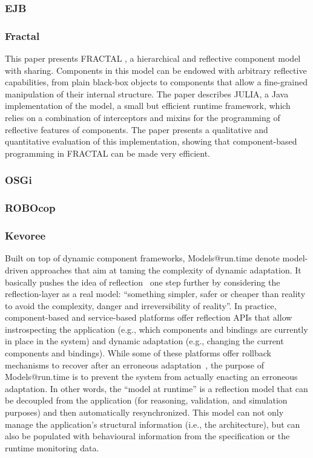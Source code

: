 \subsubsection{EJB}
\subsubsection{Fractal}
This paper presents FRACTAL \cite{Bruneton:2006:FCM:1152333.1152345}, a hierarchical and reflective component model with sharing.
Components in this model can be endowed with arbitrary reflective capabilities, from plain black-box objects to
components that allow a fine-grained manipulation of their internal structure.
The paper describes JULIA, a Java implementation of the model, a small but efficient runtime framework, which relies on
a combination of interceptors and mixins for the programming of reflective features of components.
The paper presents a qualitative and quantitative evaluation of this implementation, showing that
component-based programming in FRACTAL can be made very efficient. 
\subsubsection{OSGi}
\subsubsection{ROBOcop}
\subsubsection{Kevoree}

Built on top of dynamic component frameworks, Models@run.time denote model-driven approaches that aim at taming the complexity of dynamic adaptation.
It basically pushes the idea of reflection~\cite{morin09a} one step further by considering the reflection-layer as a real model: ``something simpler, safer or cheaper than reality to avoid the complexity, danger and irreversibility of reality''.
In practice, component-based and service-based platforms offer reflection APIs that allow instrospecting the application (e.g., which components and bindings are currently in place in the system) and dynamic adaptation (e.g., changing the current components and bindings).
While some of these platforms offer rollback mechanisms to recover after an erroneous adaptation~\cite{leger2010reliable}, the purpose of Models@run.time is to prevent the system from actually enacting an erroneous adaptation. 
In other words, the ``model at runtime'' is a reflection model that can be decoupled from the application (for reasoning, validation, and simulation purposes) and then automatically resynchronized.
This model can not only manage the application's structural information (i.e., the architecture), but can also be populated with behavioural information from the specification or the runtime monitoring data.


